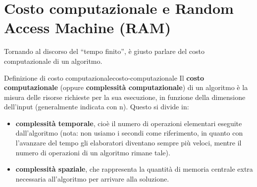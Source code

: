 \documentclass[12pt]{report}
\begin{document}
    \section{Costo computazionale e Random Access Machine (RAM)}
    Tornando al discorso del “tempo finito”, è giusto parlare del costo computazionale di un algoritmo.
    
    \begin{definizione}{Definizione di costo computazionale}{costo-computazionale}
    Il \textbf{costo computazionale} (oppure \textbf{complessità computazionale}) di un algoritmo è la misura delle risorse richieste per la sua esecuzione, in funzione della dimensione dell’input (generalmente indicata con n).
    Questo si divide in:
    \begin{itemize}
        
        \item \textbf{complessità temporale}, cioè il numero di operazioni elementari eseguite dall’algoritmo (nota: non usiamo i secondi come riferimento, in quanto con l’avanzare del tempo gli elaboratori diventano sempre più veloci, mentre il numero di operazioni di un algoritmo rimane tale).
        
        \item \textbf{complessità spaziale}, che rappresenta la quantità di memoria centrale extra necessaria all’algoritmo per arrivare alla soluzione.
        
    \end{itemize}

    \end{definizione}
        	
\end{document}
